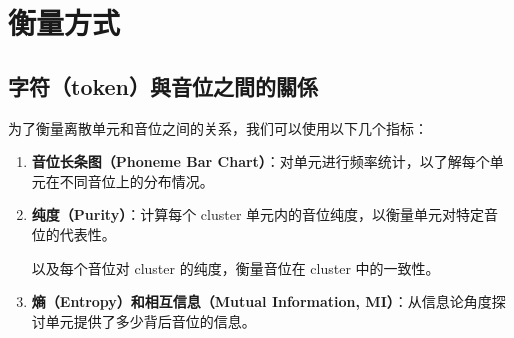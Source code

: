  


 

\section{衡量方式}

\subsection{字符（token）與音位之間的關係}




为了衡量离散单元和音位之间的关系，我们可以使用以下几个指标：

\begin{enumerate}
    \item \textbf{音位长条图（Phoneme Bar Chart）}：对单元进行频率统计，以了解每个单元在不同音位上的分布情况。
    \item \textbf{纯度（Purity）}：计算每个 cluster 单元内的音位纯度，以衡量单元对特定音位的代表性。 


以及每个音位对 cluster 的纯度，衡量音位在 cluster 中的一致性。

    \item \textbf{熵（Entropy）和相互信息（Mutual Information, MI）}：从信息论角度探讨单元提供了多少背后音位的信息。 

\end{enumerate}

